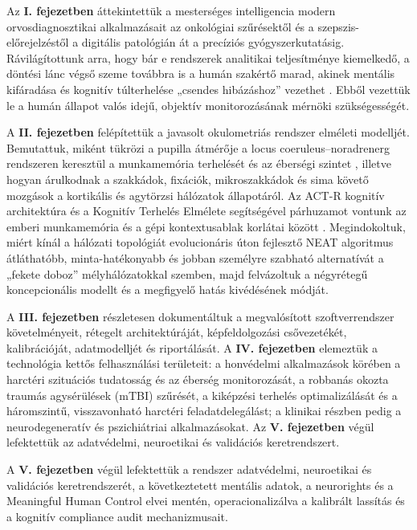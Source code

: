 \documentclass[12pt,a4paper,oneside]{book}
\begin{document}
Az \textbf{I. fejezetben} áttekintettük a mesterséges intelligencia modern orvosdiagnosztikai alkalmazásait az onkológiai szűrésektől és a szepszis-előrejelzéstől a digitális patológián át a precíziós gyógyszerkutatásig. Rávilágítottunk arra, hogy bár e rendszerek analitikai teljesítménye kiemelkedő, a döntési lánc végső szeme továbbra is a humán szakértő marad, akinek mentális kifáradása és kognitív túlterhelése „csendes hibázáshoz” vezethet \cite{wang2026}. Ebből vezettük le a humán állapot valós idejű, objektív monitorozásának mérnöki szükségességét.

A \textbf{II. fejezetben} felépítettük a javasolt okulometriás rendszer elméleti modelljét. Bemutattuk, miként tükrözi a pupilla átmérője a locus coeruleus--noradrenerg rendszeren keresztül a munkamemória terhelését és az éberségi szintet \cite{beatty1982, eckstein2017}, illetve hogyan árulkodnak a szakkádok, fixációk, mikroszakkádok és sima követő mozgások a kortikális és agytörzsi hálózatok állapotáról. Az ACT-R kognitív architektúra \cite{anderson2007} és a Kognitív Terhelés Elmélete \cite{sweller2011, cowan2010} segítségével párhuzamot vontunk az emberi munkamemória és a gépi kontextusablak korlátai között \cite{wang2026}. Megindokoltuk, miért kínál a hálózati topológiát evolucionáris úton fejlesztő NEAT algoritmus \cite{stanley2002} átláthatóbb, minta-hatékonyabb és jobban személyre szabható alternatívát a „fekete doboz” mélyhálózatokkal szemben, majd felvázoltuk a négyrétegű koncepcionális modellt és a megfigyelő hatás kivédésének módját.

A \textbf{III. fejezetben} részletesen dokumentáltuk a megvalósított szoftverrendszer követelményeit, rétegelt architektúráját, képfeldolgozási csővezetékét, kalibrációját, adatmodelljét és riportálását. A \textbf{IV. fejezetben} elemeztük a technológia kettős felhasználási területeit: a honvédelmi alkalmazások körében a harctéri szituációs tudatosság és az éberség monitorozását, a robbanás okozta traumás agysérülések (mTBI) szűrését, a kiképzési terhelés optimalizálását és a háromszintű, visszavonható harctéri feladatdelegálást; a klinikai részben pedig a neurodegeneratív és pszichiátriai alkalmazásokat. Az \textbf{V. fejezetben} végül lefektettük az adatvédelmi, neuroetikai és validációs keretrendszert.

A \textbf{V. fejezetben} végül lefektettük a rendszer adatvédelmi, neuroetikai és validációs keretrendszerét, a következtetett mentális adatok, a neurorights és a Meaningful Human Control elvei mentén, operacionalizálva a kalibrált lassítás és a kognitív compliance audit mechanizmusait.
\end{document}
